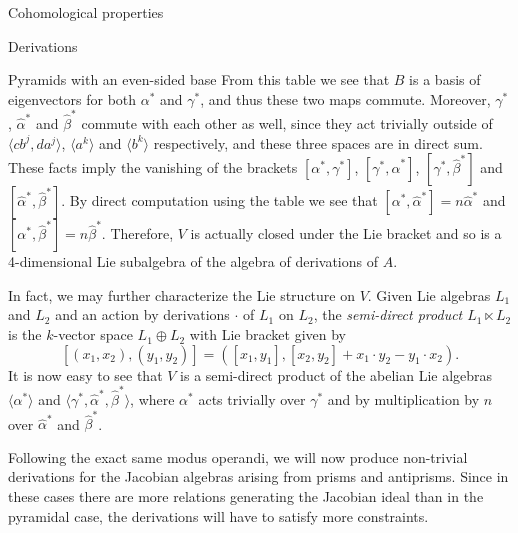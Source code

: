 \begin{chapter}{Cohomological properties}
\begin{section}{Derivations}
\begin{subsection}{Pyramids with an even-sided base}
From this table we see that $B$ is a basis of eigenvectors for both $\alpha^*$ and $\gamma^*$, and thus these two maps commute. Moreover, $\gamma^*$, $\hat\alpha^*$ and $\hat\beta^*$ commute with each other as well, since they act trivially outside of $\langle cb^j, da^j\rangle$, $\langle a^k\rangle$ and $\langle b^k\rangle$ respectively, and these three spaces are in direct sum. These facts imply the vanishing of the brackets $[\alpha^*,\gamma^*]$,  $[\gamma^*, \hat\alpha^*]$, $[\gamma^*, \hat\beta^*]$ and $[\hat\alpha^*, \hat\beta^*]$. By direct computation  using the table we see that $[\alpha^*,\hat\alpha^*]=n\hat\alpha^*$ and $[\alpha^*,\hat\beta^*]=n\hat\beta^*$. Therefore, $V$ is actually closed under the Lie bracket and so is a 4-dimensional Lie subalgebra of the algebra of derivations of $A$.

In fact, we may further characterize the Lie structure on $V$. Given Lie algebras $L_1$ and $L_2$ and an action by derivations $\cdot$ of $L_1$ on $L_2$, the \emph{semi-direct product $L_1\ltimes L_2$} is the $k$-vector space $L_1 \oplus L_2$ with Lie bracket given by
\[[(x_1,x_2), (y_1,y_2)] = ([x_1,y_1], [x_2,y_2]+x_1\cdot y_2 - y_1\cdot x_2).\]
It is now easy to see that $V$ is a semi-direct product of the abelian Lie algebras $\langle \alpha^*\rangle$ and $\langle \gamma^*, \hat\alpha^*, \hat\beta^*\rangle$, where $\alpha^*$ acts trivially over $\gamma^*$ and by multiplication by $n$ over $\hat\alpha^*$ and $\hat\beta^*$.
\end{subsection}

Following the exact same modus operandi, we will now produce non-trivial derivations for the Jacobian algebras arising from prisms and antiprisms. Since in these cases there are more relations generating the Jacobian ideal than in the pyramidal case, the derivations will have to satisfy more constraints.


\end{section}
\end{chapter}
